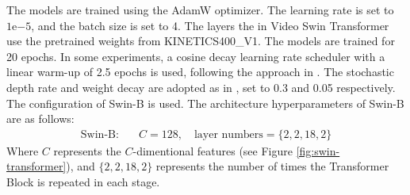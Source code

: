 The models are trained using the AdamW \cite{loshchilov_decoupled_2019} optimizer.  The learning rate is set to $1 \mathrm{e}{-5}$, and the batch size is set to 4. The layers the in Video Swin Transformer use the pretrained weights from KINETICS400\_V1. The models are trained for 20 epochs. In some experiments, a cosine decay learning rate scheduler with a linear warm-up of 2.5 epochs is used, following the approach in \cite{liu_video_2021}. The stochastic depth rate and weight decay are adopted as in \cite{liu_video_2021}, set to 0.3 and 0.05 respectively. The configuration of Swin-B is used. The architecture hyperparameters of Swin-B are as follows:
\begin{align}
    \text{Swin-B:} &\quad C = 128, \quad \text{layer numbers} = \{2, 2, 18, 2\}
\end{align}
Where $C$ represents the $C$-dimentional features (see Figure \ref{fig:swin-transformer}), and $\{2, 2, 18, 2\}$ represents the number of times the Transformer Block is repeated in each stage.

